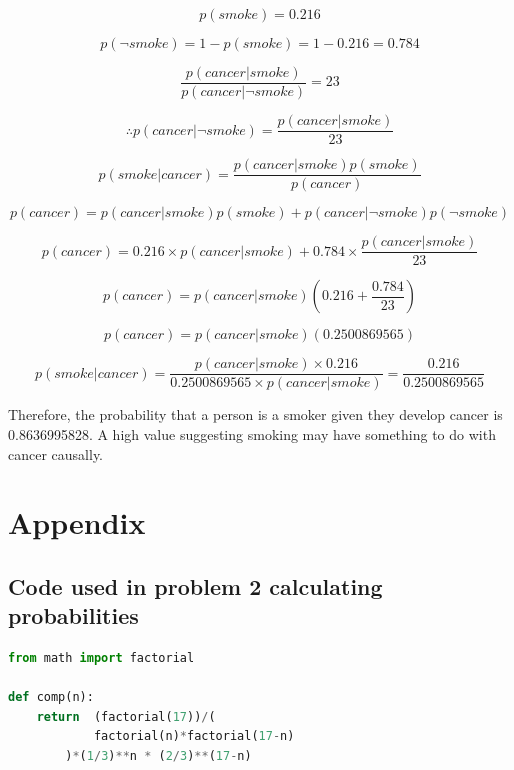 \documentclass{article}
\begin{document}
$$p(smoke) = 0.216$$

$$p(\neg smoke) = 1 - p(smoke) = 1 - 0.216 = 0.784$$

$$\frac{p(cancer | smoke)}{p(cancer | \neg smoke)} = 23$$

$$\therefore p(cancer | \neg smoke) = \frac{p(cancer | smoke)}{23}$$

$$p(smoke | cancer) = \frac{p(cancer | smoke) p(smoke)}{p(cancer)}$$

$$p(cancer) = p(cancer|smoke)p(smoke) + p(cancer|\neg smoke)p(\neg smoke)$$

$$p(cancer) = 0.216  \times p(cancer|smoke) + 0.784 \times \frac{p(cancer | smoke)}{23}$$

$$p(cancer) = p(cancer|smoke) \left ( 0.216  + \frac{0.784}{23} \right )$$

$$p(cancer) = p(cancer|smoke) \left ( 0.2500869565 \right )$$

$$p(smoke | cancer) = \frac{p(cancer | smoke) \times 0.216 }{0.2500869565 \times p(cancer|smoke)} = \frac{0.216}{0.2500869565}$$

Therefore, the probability that a person is a smoker given they develop cancer is 0.8636995828. A high value suggesting
smoking may have something to do with cancer causally.

\section*{Appendix}

\subsection*{Code used in problem 2 calculating probabilities}

\begin{lstlisting}[language=Python]
from math import factorial

def comp(n):
    return  (factorial(17))/(
            factorial(n)*factorial(17-n)
        )*(1/3)**n * (2/3)**(17-n)
\end{lstlisting}
\end{document}
